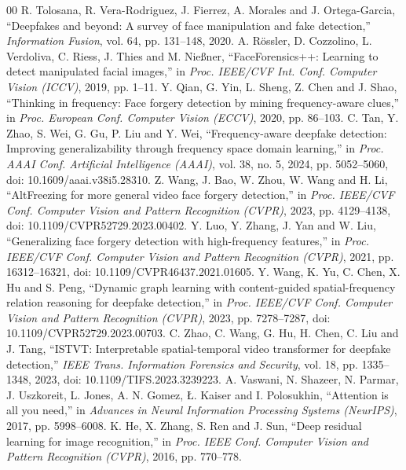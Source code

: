 \documentclass[conference]{IEEEtran}
\begin{document}
\begin{thebibliography}{00}
 R. Tolosana, R. Vera-Rodriguez, J. Fierrez, A. Morales and J. Ortega-Garcia, ``Deepfakes and beyond: A survey of face manipulation and fake detection,'' \textit{Information Fusion}, vol. 64, pp. 131--148, 2020.
 A. R{\"o}ssler, D. Cozzolino, L. Verdoliva, C. Riess, J. Thies and M. Nie{\ss}ner, ``FaceForensics++: Learning to detect manipulated facial images,'' in \textit{Proc. IEEE/CVF Int. Conf. Computer Vision (ICCV)}, 2019, pp. 1--11.
 Y. Qian, G. Yin, L. Sheng, Z. Chen and J. Shao, ``Thinking in frequency: Face forgery detection by mining frequency-aware clues,'' in \textit{Proc. European Conf. Computer Vision (ECCV)}, 2020, pp. 86--103.
 C. Tan, Y. Zhao, S. Wei, G. Gu, P. Liu and Y. Wei, ``Frequency-aware deepfake detection: Improving generalizability through frequency space domain learning,'' in \textit{Proc. AAAI Conf. Artificial Intelligence (AAAI)}, vol. 38, no. 5, 2024, pp. 5052--5060, doi: 10.1609/aaai.v38i5.28310.
 Z. Wang, J. Bao, W. Zhou, W. Wang and H. Li, ``AltFreezing for more general video face forgery detection,'' in \textit{Proc. IEEE/CVF Conf. Computer Vision and Pattern Recognition (CVPR)}, 2023, pp. 4129--4138, doi: 10.1109/CVPR52729.2023.00402.
 Y. Luo, Y. Zhang, J. Yan and W. Liu, ``Generalizing face forgery detection with high-frequency features,'' in \textit{Proc. IEEE/CVF Conf. Computer Vision and Pattern Recognition (CVPR)}, 2021, pp. 16312--16321, doi: 10.1109/CVPR46437.2021.01605.
 Y. Wang, K. Yu, C. Chen, X. Hu and S. Peng, ``Dynamic graph learning with content-guided spatial-frequency relation reasoning for deepfake detection,'' in \textit{Proc. IEEE/CVF Conf. Computer Vision and Pattern Recognition (CVPR)}, 2023, pp. 7278--7287, doi: 10.1109/CVPR52729.2023.00703.
 C. Zhao, C. Wang, G. Hu, H. Chen, C. Liu and J. Tang, ``ISTVT: Interpretable spatial-temporal video transformer for deepfake detection,'' \textit{IEEE Trans. Information Forensics and Security}, vol. 18, pp. 1335--1348, 2023, doi: 10.1109/TIFS.2023.3239223.
 A. Vaswani, N. Shazeer, N. Parmar, J. Uszkoreit, L. Jones, A. N. Gomez, {\L}. Kaiser and I. Polosukhin, ``Attention is all you need,'' in \textit{Advances in Neural Information Processing Systems (NeurIPS)}, 2017, pp. 5998--6008.
 K. He, X. Zhang, S. Ren and J. Sun, ``Deep residual learning for image recognition,'' in \textit{Proc. IEEE Conf. Computer Vision and Pattern Recognition (CVPR)}, 2016, pp. 770--778.

\end{thebibliography}
\end{document}
